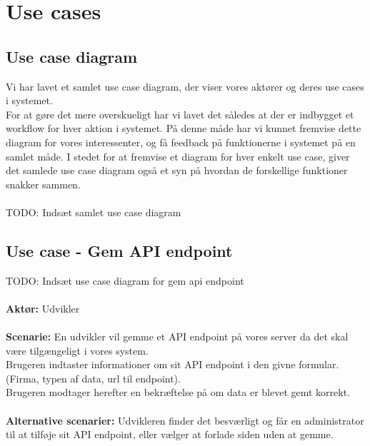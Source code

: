 \section{Use cases}
\subsection{Use case diagram}
Vi har lavet et samlet use case diagram, der viser vores aktører og deres use cases i systemet.\\
For at gøre det mere overskueligt har vi lavet det således at der er indbygget et workflow for hver aktion i systemet.
På denne måde har vi kunnet fremvise dette diagram for vores interessenter, og få feedback på funktionerne i systemet på en samlet måde.
I stedet for at fremvise et diagram for hver enkelt use case, giver det samlede use case diagram  også et syn på hvordan de forskellige funktioner snakker sammen.
\\\\
TODO: Indsæt samlet use case diagram
\subsection{Use case - Gem API endpoint}
TODO: Indsæt use case diagram for gem api endpoint
\\\\
\textbf{Aktør:} Udvikler
\\\\
\textbf{Scenarie:} En udvikler vil gemme et API endpoint på vores server da det skal være tilgængeligt i vores system. \\
Brugeren indtaster informationer om sit API endpoint i den givne formular. (Firma, typen af data, url til endpoint). \\
Brugeren modtager herefter en bekræftelse på om data er blevet gemt korrekt.
\\\\
\textbf{Alternative scenarier:} Udvikleren finder det besværligt og får en administrator til at tilføje sit API endpoint,
eller vælger at forlade siden uden at gemme.

